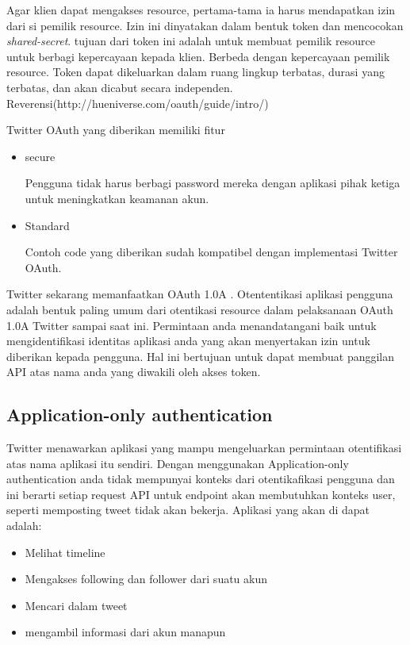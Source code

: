 Agar klien dapat mengakses resource, pertama-tama ia harus mendapatkan izin dari si pemilik resource. Izin ini dinyatakan dalam bentuk token dan mencocokan \textit{shared-secret}. tujuan dari token ini adalah untuk membuat pemilik resource untuk berbagi kepercayaan kepada klien. Berbeda dengan kepercayaan pemilik resource. Token dapat dikeluarkan dalam ruang lingkup terbatas, durasi yang terbatas, dan akan dicabut secara independen. Reverensi(http://hueniverse.com/oauth/guide/intro/)

Twitter OAuth yang diberikan memiliki fitur
\begin{itemize}
	\item secure
	
	Pengguna tidak harus berbagi password mereka dengan aplikasi pihak ketiga untuk meningkatkan keamanan akun.
	\item Standard
	
	Contoh code yang diberikan sudah kompatibel dengan implementasi Twitter OAuth.
\end{itemize}

Twitter sekarang memanfaatkan OAuth 1.0A . Otententikasi aplikasi pengguna adalah bentuk paling umum dari otentikasi resource dalam pelaksanaan OAuth 1.0A Twitter sampai saat ini. Permintaan anda menandatangani baik untuk mengidentifikasi identitas aplikasi anda yang akan menyertakan izin untuk diberikan kepada pengguna. Hal ini bertujuan untuk dapat membuat panggilan API atas nama anda yang diwakili oleh akses token.

\subsection{Application-only authentication}
Twitter menawarkan aplikasi yang mampu mengeluarkan permintaan otentifikasi atas nama aplikasi itu sendiri. Dengan menggunakan Application-only authentication  anda tidak mempunyai konteks dari otentikafikasi pengguna dan ini berarti setiap request API untuk endpoint akan membutuhkan konteks user, seperti memposting tweet tidak akan bekerja. Aplikasi yang akan di dapat adalah: 

\begin{itemize}
	\item Melihat timeline
	\item Mengakses following dan follower dari suatu akun
	\item Mencari dalam tweet
	\item mengambil informasi dari akun manapun
\end{itemize}


